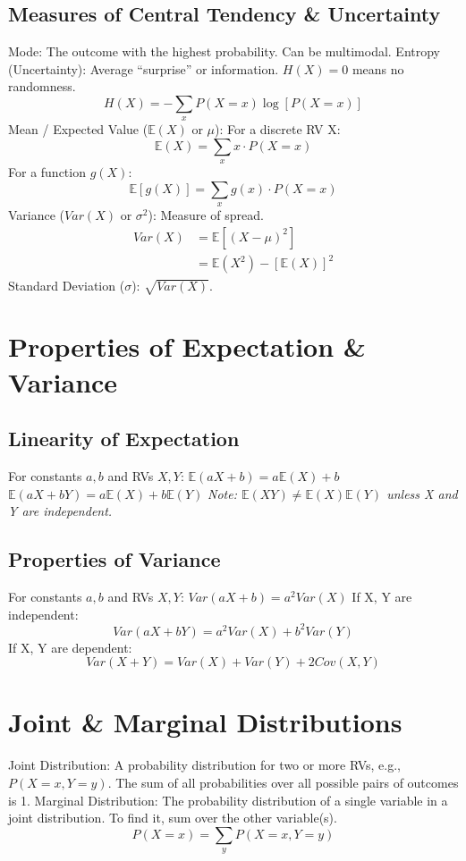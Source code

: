 \documentclass[8pt]{article}
\begin{document}
\begin{multicols}{3}
\subsection*{Measures of Central Tendency \& Uncertainty}
Mode: The outcome with the highest probability. Can be multimodal.
Entropy (Uncertainty): Average “surprise” or information. $H(X)=0$ means no randomness.
$$H(X) = -\sum_{x} P(X=x) \log[P(X=x)]$$
Mean / Expected Value ($\mathbb{E}(X)$ or $\mu$):
For a discrete RV X:
$$\mathbb{E}(X) = \sum_{x} x \cdot P(X=x)$$
For a function $g(X)$:
$$\mathbb{E}[g(X)] = \sum_{x} g(x) \cdot P(X=x)$$
Variance ($Var(X)$ or $\sigma^2$): Measure of spread.
\begin{align*}
Var(X) &= \mathbb{E}[(X-\mu)^2] \\
       &= \mathbb{E}(X^2) - [\mathbb{E}(X)]^2
\end{align*}
Standard Deviation ($\sigma$): $\sqrt{Var(X)}$.
\section*{Properties of Expectation \& Variance}
\subsection*{Linearity of Expectation}
For constants $a, b$ and RVs $X, Y$:
$\mathbb{E}(aX + b) = a\mathbb{E}(X) + b$
$\mathbb{E}(aX + bY) = a\mathbb{E}(X) + b\mathbb{E}(Y)$
\textit{Note: $\mathbb{E}(XY) \neq \mathbb{E}(X)\mathbb{E}(Y)$ unless X and Y are independent.}
\subsection*{Properties of Variance}
For constants $a, b$ and RVs $X, Y$:
$Var(aX + b) = a^2 Var(X)$
If X, Y are independent:
$$Var(aX + bY) = a^2 Var(X) + b^2 Var(Y)$$
If X, Y are dependent:
$$Var(X+Y) = Var(X)+Var(Y)+2Cov(X,Y)$$
\section*{Joint \& Marginal Distributions}
Joint Distribution: A probability distribution for two or more RVs, e.g., $P(X=x, Y=y)$. The sum of all probabilities over all possible pairs of outcomes is 1.
Marginal Distribution: The probability distribution of a single variable in a joint distribution. To find it, sum over the other variable(s).
$$P(X=x) = \sum_{y} P(X=x, Y=y)$$

\end{multicols}
\end{document}
